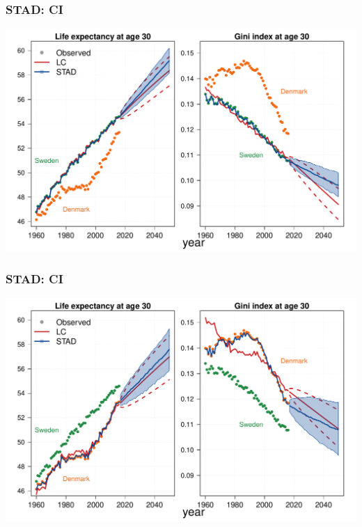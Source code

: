 \documentclass[12pt, xcolor=table]{beamer}  %
\begin{document}
\begin{frame}[noframenumbering]\frametitle{STAD: CI}

\vspace{-0.5cm}
	
	
	\begin{center}	
		\vspace{0.2cm}
		
		\includegraphics[scale=.42]{Figures/Ch2/F5_1}
		
	\end{center}
	
\end{frame}

\begin{frame}[noframenumbering]\frametitle{STAD: CI}

\vspace{-0.5cm}
	
	
	\begin{center}	
		\vspace{0.2cm}
		
		\includegraphics[scale=.42]{Figures/Ch2/F5_2}
		
	\end{center}
	
\end{frame}
\end{document}
